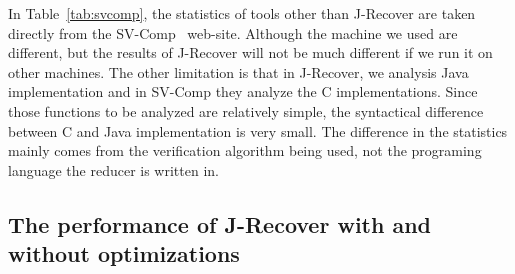 \documentclass{llncs}
\begin{document}
In Table~\ref{tab:svcomp}, the statistics of tools other than J-Recover are taken directly from the SV-Comp~\cite{svcomp} web-site. Although the machine we used are different, but the results of J-Recover will not be much different if we run it on other machines. The other limitation is that in J-Recover, we analysis Java implementation and in SV-Comp they analyze the C implementations. Since those functions to be analyzed are relatively simple, the syntactical difference between C and Java implementation is very small. The difference in the statistics mainly comes from the verification algorithm being used, not the programing language the reducer is written in.
\begin{table}[t]
	\caption{SV-Comp 2018 results on reducer commutativity. For space reason, we only list results of competitive tool in this table, which includes top three tools in the overall ranking and the reachability safety category.}
	\label{tab:svcomp}
\end{table}





\subsection{The performance of J-Recover with and without optimizations}
\end{document}
